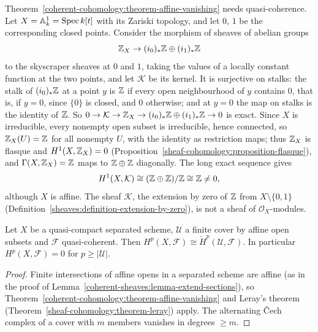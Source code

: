 \begin{counterexample}\label{coherent-cohomology:counterexample-not-quasi-coherent}
Theorem~\ref{coherent-cohomology:theorem-affine-vanishing} needs quasi-coherence. Let $X = \mathbb{A}^1_k = \operatorname{Spec} k[t]$ with its Zariski topology, and let $0$, $1$ be the corresponding closed points. Consider the morphism of sheaves of
abelian groups
\[
\mathbb{Z}_X \to (i_0)_*\mathbb{Z} \oplus (i_1)_*\mathbb{Z}
\]
to the skyscraper sheaves at $0$ and $1$, taking the values of a locally constant function at the two points, and let $\mathcal{K}$ be its kernel. It is surjective on stalks: the stalk of $(i_0)_*\mathbb{Z}$ at a point $y$ is $\mathbb{Z}$
if every open neighbourhood of $y$ contains $0$, that is, if $y = 0$, since $\{0\}$ is closed, and $0$ otherwise; and at $y = 0$ the map on stalks is the identity of $\mathbb{Z}$. So
$0 \to \mathcal{K} \to \mathbb{Z}_X \to (i_0)_*\mathbb{Z} \oplus (i_1)_*\mathbb{Z} \to 0$ is exact. Since $X$ is irreducible, every nonempty open subset is irreducible, hence connected, so $\mathbb{Z}_X(U) = \mathbb{Z}$ for all nonempty $U$, with the identity as
restriction maps; thus $\mathbb{Z}_X$ is flasque and $H^1(X, \mathbb{Z}_X) = 0$ (Proposition~\ref{sheaf-cohomology:proposition-flasque}), and $\Gamma(X, \mathbb{Z}_X) = \mathbb{Z}$ maps to $\mathbb{Z} \oplus \mathbb{Z}$ diagonally. The long exact sequence gives
\[
H^1(X, \mathcal{K}) \cong (\mathbb{Z} \oplus \mathbb{Z})/\mathbb{Z} \cong \mathbb{Z} \neq 0,
\]
although $X$ is affine. The sheaf $\mathcal{K}$, the extension by zero of $\mathbb{Z}$ from $X \setminus \{0, 1\}$ (Definition~\ref{sheaves:definition-extension-by-zero}), is not a sheaf of $\mathcal{O}_X$-modules.
\end{counterexample}

\begin{corollary}\label{coherent-cohomology:corollary-cech-computes}
Let $X$ be a quasi-compact separated scheme, $\mathcal{U}$ a finite cover by affine open subsets and $\mathcal{F}$ quasi-coherent. Then
$H^p(X, \mathcal{F}) \cong \check H^p(\mathcal{U}, \mathcal{F})$. In particular $H^p(X, \mathcal{F}) = 0$ for $p \geq |\mathcal{U}|$.
\end{corollary}

\begin{proof}
Finite intersections of affine opens in a separated scheme are affine (as in the proof of Lemma~\ref{coherent-sheaves:lemma-extend-sections}), so
Theorem~\ref{coherent-cohomology:theorem-affine-vanishing} and Leray's theorem (Theorem~\ref{sheaf-cohomology:theorem-leray}) apply. The alternating \v{C}ech
complex of a cover with $m$ members vanishes in degrees $\geq m$.
\end{proof}


